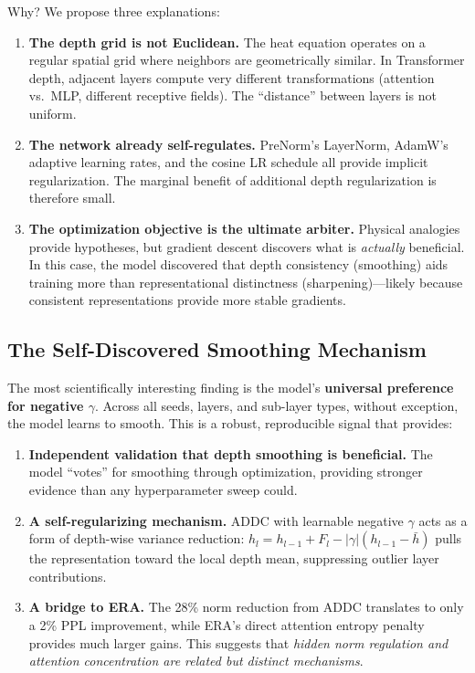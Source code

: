 \documentclass[10pt]{article}
\begin{document}
Why? We propose three explanations:

\begin{enumerate}[leftmargin=*,itemsep=2pt]
    \item \textbf{The depth grid is not Euclidean.} The heat equation operates on a regular spatial grid where neighbors are geometrically similar. In Transformer depth, adjacent layers compute very different transformations (attention vs.\ MLP, different receptive fields). The ``distance'' between layers is not uniform.
    \item \textbf{The network already self-regulates.} PreNorm's LayerNorm, AdamW's adaptive learning rates, and the cosine LR schedule all provide implicit regularization. The marginal benefit of additional depth regularization is therefore small.
    \item \textbf{The optimization objective is the ultimate arbiter.} Physical analogies provide hypotheses, but gradient descent discovers what is \emph{actually} beneficial. In this case, the model discovered that depth consistency (smoothing) aids training more than representational distinctness (sharpening)---likely because consistent representations provide more stable gradients.
\end{enumerate}

\subsection{The Self-Discovered Smoothing Mechanism}

The most scientifically interesting finding is the model's \textbf{universal preference for negative $\gamma$}. Across all seeds, layers, and sub-layer types, without exception, the model learns to smooth. This is a robust, reproducible signal that provides:

\begin{enumerate}[leftmargin=*,itemsep=2pt]
    \item \textbf{Independent validation that depth smoothing is beneficial.} The model ``votes'' for smoothing through optimization, providing stronger evidence than any hyperparameter sweep could.
    \item \textbf{A self-regularizing mechanism.} ADDC with learnable negative $\gamma$ acts as a form of depth-wise variance reduction: $h_l = h_{l-1} + F_l - |\gamma|(h_{l-1} - \bar{h})$ pulls the representation toward the local depth mean, suppressing outlier layer contributions.
    \item \textbf{A bridge to ERA.} The 28\% norm reduction from ADDC translates to only a 2\% PPL improvement, while ERA's direct attention entropy penalty provides much larger gains. This suggests that \emph{hidden norm regulation and attention concentration are related but distinct mechanisms}.
\end{enumerate}
\end{document}
